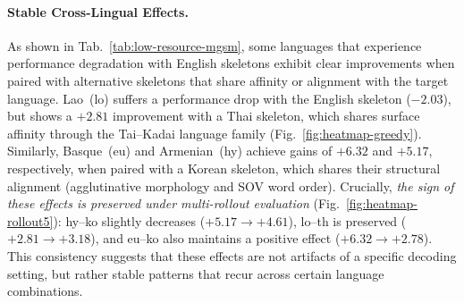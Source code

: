 \paragraph{Stable Cross-Lingual Effects.}
As shown in Tab.~\ref{tab:low-resource-mgsm}, some languages that experience performance degradation with English skeletons exhibit clear improvements when paired with alternative skeletons that share affinity or alignment with the target language. Lao~(lo) suffers a performance drop with the English skeleton ($-2.03$), but shows a $+2.81$ improvement with a Thai skeleton, which shares surface affinity through the Tai--Kadai language family (Fig.~\ref{fig:heatmap-greedy}). Similarly, Basque~(eu) and Armenian~(hy) achieve gains of $+6.32$ and $+5.17$, respectively, when paired with a Korean skeleton, which shares their structural alignment (agglutinative morphology and SOV word order). Crucially, \textit{the sign of these effects is preserved under multi-rollout evaluation} (Fig.~\ref{fig:heatmap-rollout5}): hy--ko slightly decreases ($+5.17 \to +4.61$), lo--th is preserved ($+2.81 \to +3.18$), and eu--ko also maintains a positive effect ($+6.32 \to +2.78$). This consistency suggests that these effects are not artifacts of a specific decoding setting, but rather stable patterns that recur across certain language combinations.


